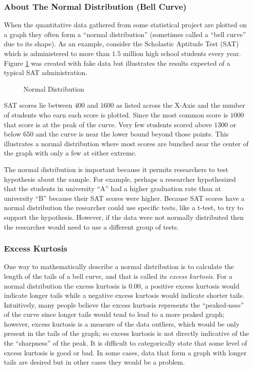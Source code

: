 \subsubsection{About The Normal Distribution (Bell Curve)}\label{int:normal_distribution}

When the quantitative data gathered from some statistical project are plotted on a graph they often form a ``normal distribution'' (sometimes called a ``bell curve'' due to its shape). As an example, consider the Scholastic Aptitude Test (SAT) which is administered to more than $ 1.5 $ million high school students every year. Figure \ref{int:normal_dist_figure} was created with fake data but illustrates the results expected of a typical SAT administration.

\begin{figure}[H]
  \begin{center}
    \caption{Normal Distribution}
    \label{int:normal_dist_figure}
  \end{center}
\end{figure}

SAT scores lie between $ 400 $ and $ 1600 $ as listed across the X-Axis and the number of students who earn each score is plotted. Since the most common score is $ 1000 $ that score is at the peak of the curve. Very few students scored above $ 1300 $ or below $ 650 $ and the curve is near the lower bound beyond those points. This illustrates a normal distribution where most scores are bunched near the center of the graph with only a few at either extreme.

The normal distribution is important because it permits researchers to test hypothesis about the sample. For example, perhaps a researcher hypothesized that the students in university ``A'' had a higher graduation rate than at university ``B'' because their SAT scores were higher. Because SAT scores have a normal distribution the researcher could use specific tests, like a t-test, to try to support the hypothesis. However, if the data were not normally distributed then the researcher would need to use a different group of tests.

\subsubsection{Excess Kurtosis}
One way to mathematically describe a normal distribution is to calculate the length of the tails of a bell curve, and that is called its \textit{excess kurtosis}. For a normal distribution the excess kurtosis is $ 0.00 $, a positive excess kurtosis would indicate longer tails while a negative excess kurtosis would indicate shorter tails. Intuitively, many people believe the excess kurtosis represents the ``peaked-ness'' of the curve since longer tails would tend to lead to a more peaked graph; however, excess kurtosis is a measure of the data outliers, which would be only present in the tails of the graph; so excess kurtosis is not directly indicative of the the ``sharpness'' of the peak. It is difficult to categorically state that some level of excess kurtosis is good or bad. In some cases, data that form a graph with longer tails are desired but in other cases they would be a problem.

